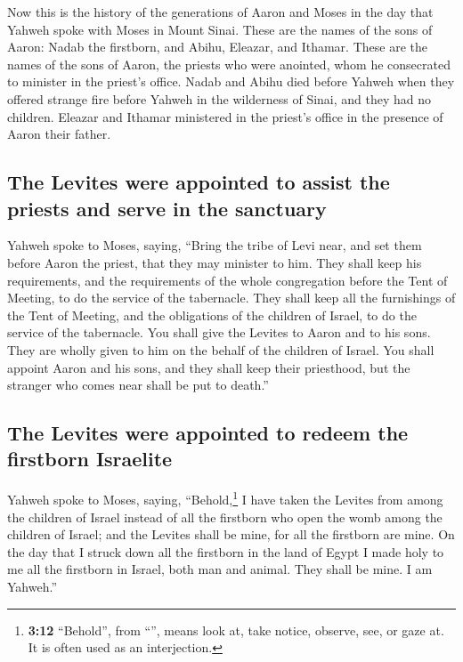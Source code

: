  Now this is the history of the generations of Aaron and
Moses in the day that Yahweh spoke with Moses in Mount Sinai.
 These are the names of the sons of Aaron: Nadab the
firstborn, and Abihu, Eleazar, and Ithamar.  These are the
names of the sons of Aaron, the priests who were anointed, whom he
consecrated to minister in the priest's office.  Nadab and
Abihu died before Yahweh when they offered strange fire before Yahweh in
the wilderness of Sinai, and they had no children. Eleazar and Ithamar
ministered in the priest's office in the presence of Aaron their father.

\hypertarget{the-levites-were-appointed-to-assist-the-priests-and-serve-in-the-sanctuary}{%
\subsection{The Levites were appointed to assist the priests and serve
in the
sanctuary}\label{the-levites-were-appointed-to-assist-the-priests-and-serve-in-the-sanctuary}}

 Yahweh spoke to Moses, saying,  ``Bring the
tribe of Levi near, and set them before Aaron the priest, that they may
minister to him.  They shall keep his requirements, and
the requirements of the whole congregation before the Tent of Meeting,
to do the service of the tabernacle.  They shall keep all
the furnishings of the Tent of Meeting, and the obligations of the
children of Israel, to do the service of the tabernacle. 
You shall give the Levites to Aaron and to his sons. They are wholly
given to him on the behalf of the children of Israel. 
You shall appoint Aaron and his sons, and they shall keep their
priesthood, but the stranger who comes near shall be put to death.''

\hypertarget{the-levites-were-appointed-to-redeem-the-firstborn-israelite}{%
\subsection{The Levites were appointed to redeem the firstborn
Israelite}\label{the-levites-were-appointed-to-redeem-the-firstborn-israelite}}

 Yahweh spoke to Moses, saying, 
``Behold,\footnote{\textbf{3:12} ``Behold'', from ``'',
  means look at, take notice, observe, see, or gaze at. It is often used
  as an interjection.} I have taken the Levites from among the children
of Israel instead of all the firstborn who open the womb among the
children of Israel; and the Levites shall be mine,  for
all the firstborn are mine. On the day that I struck down all the
firstborn in the land of Egypt I made holy to me all the firstborn in
Israel, both man and animal. They shall be mine. I am Yahweh.''

